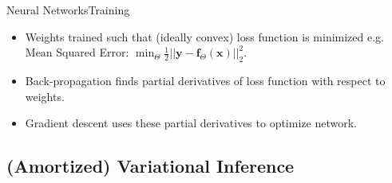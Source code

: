 \documentclass[handout]{beamer}
\begin{document}
\begin{frame}{Neural Networks}{Training}
\begin{itemize}
\item Weights trained such that (ideally convex) loss function is minimized e.g. Mean Squared Error: $\min_\Theta \frac{1}{2}||\bm{y}-\bm{f}_\Theta(\bm{x})||^2_2$.
\vspace{0.5cm}
\item Back-propagation finds partial derivatives of loss function with respect to weights.
\vspace{0.5cm}
\item Gradient descent uses these partial derivatives to optimize network.
\end{itemize}
\end{frame}
\subsection{(Amortized) Variational Inference}
\end{document}
